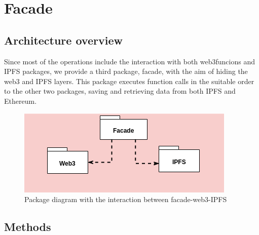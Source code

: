 \section{Facade} 

\subsection{Architecture overview}

Since most of the operations include the interaction with both web3funcions and IPFS packages, we provide a third package, facade, with the aim of hiding the web3 and IPFS layers. This package executes function calls in the suitable order to the other two packages, saving and retrieving data from both IPFS and Ethereum.

\begin{figure}[h]
	\centering
	\includegraphics[scale=0.6]{res/images/facade.png}
	\caption{Package diagram with the interaction between facade-web3-IPFS}
\end{figure}

\subsection{Methods}

